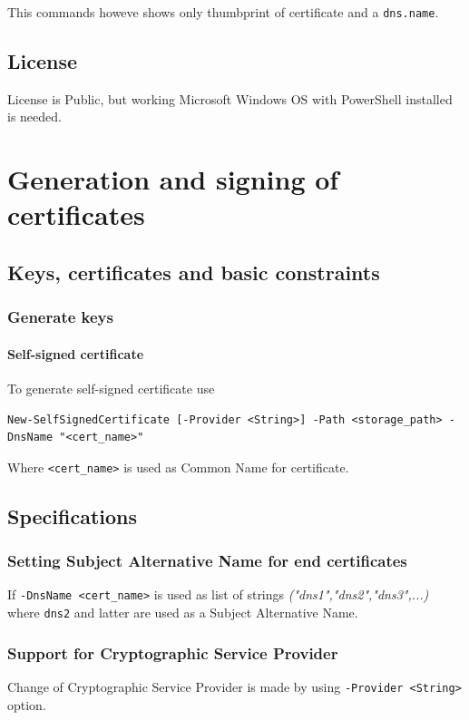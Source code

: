 \documentclass[10pt, a4paper]{report}
\begin{document}
{This commands howeve shows only thumbprint of certificate and a \verb+dns.name+. 
  \subsection{License}
License is Public, but working Microsoft Windows OS with PowerShell installed is needed.
  
\section{Generation and signing of certificates}

  \subsection{Keys, certificates and basic constraints}
  
    \subsubsection{Generate keys}
    
      \paragraph{Self-signed certificate}
To generate self-signed certificate use 
\begin{verbatim}
New-SelfSignedCertificate [-Provider <String>] -Path <storage_path> -DnsName "<cert_name>" 
\end{verbatim}

Where \verb+<cert_name>+ is used as Common Name for certificate. 

  \subsection{Specifications}
  
    \subsubsection{Setting Subject Alternative Name for end certificates}

If \verb+-DnsName <cert_name>+ is used as list of strings \textit{("dns1","dns2","dns3",...)} where \verb+dns2+ and latter are used as a Subject Alternative Name.    

    \subsubsection{Support for Cryptographic Service Provider}
Change of Cryptographic Service Provider is made by using \verb+-Provider <String>+ option.

}
\end{document}
